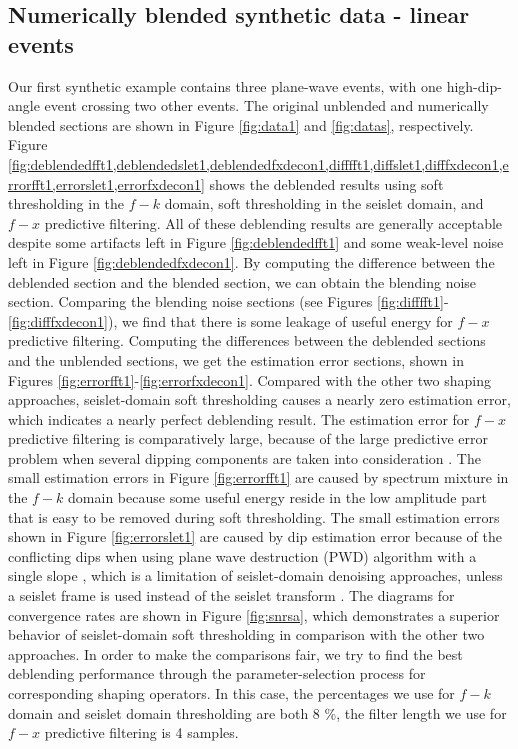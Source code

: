 \subsection{Numerically blended synthetic data - linear events}
Our first synthetic example contains three plane-wave events, with one high-dip-angle event crossing two other events.
The original unblended and numerically blended sections are shown in Figure \ref{fig:data1} and \ref{fig:datas}, respectively.
Figure \ref{fig:deblendedfft1,deblendedslet1,deblendedfxdecon1,difffft1,diffslet1,difffxdecon1,errorfft1,errorslet1,errorfxdecon1} shows the deblended results using soft thresholding in the $f-k$ domain, soft thresholding in the seislet domain, and $f-x$ predictive filtering. 
All of these deblending results are generally acceptable despite some artifacts left in Figure \ref{fig:deblendedfft1} and some weak-level noise left in Figure \ref{fig:deblendedfxdecon1}. By computing the difference between the deblended section and the blended section, we can obtain the blending noise section. Comparing the blending noise sections (see Figures \ref{fig:difffft1}-\ref{fig:difffxdecon1}), we find that there is some leakage of useful energy for $f-x$ predictive filtering. Computing the differences between the deblended sections and the unblended sections, we get the estimation error sections, shown in Figures \ref{fig:errorfft1}-\ref{fig:errorfxdecon1}. Compared with the other two shaping approaches, seislet-domain soft thresholding causes a nearly zero estimation error, which indicates a nearly perfect deblending result. The estimation error for $f-x$ predictive filtering is comparatively large, because of the large predictive error problem when several dipping components are taken into consideration \cite[]{yangkang2014}. The small estimation errors in Figure \ref{fig:errorfft1} are caused by spectrum mixture in the $f-k$ domain because some useful energy reside in the low amplitude part that is easy to be removed during soft thresholding. The small estimation errors shown in Figure \ref{fig:errorslet1} are caused by dip estimation error because of the conflicting dips when using plane wave destruction (PWD) algorithm with a single slope \cite[]{pwd}, which is a limitation of seislet-domain denoising approaches, unless a seislet frame is used instead of the seislet transform \cite[]{seislet}. The diagrams for convergence rates are shown in Figure \ref{fig:snrsa}, which demonstrates a superior behavior of seislet-domain soft thresholding in comparison with the other two approaches. In order to make the comparisons fair, we try to find the best deblending performance through the parameter-selection process for corresponding shaping operators. In this case, the percentages we use for $f-k$ domain and seislet domain thresholding are both 8 \%, the filter length we use for $f-x$ predictive filtering is 4 samples. 

